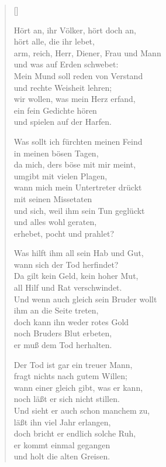 \begin{multicols}{2}
\settowidth{\versewidth}{Was hilft ihm all sein Hab und Gut,}
\begin{verse}[\versewidth]

 Hört an, ihr Völker, hört doch an,\\
hört alle, die ihr lebet,\\
arm, reich, Herr, Diener, Frau und Mann\\
und was auf Erden schwebet:\\
Mein Mund soll reden von Verstand\\
und rechte Weisheit lehren;\\
wir wollen, was mein Herz erfand,\\
ein fein Gedichte hören\\
und spielen auf der Harfen.

 Was sollt ich fürchten meinen Feind\\
in meinen bösen Tagen,\\
da mich, ders böse mit mir meint,\\
umgibt mit vielen Plagen,\\
wann mich mein Untertreter drückt\\
mit seinen Missetaten\\
und sich, weil ihm sein Tun geglückt\\
und alles wohl geraten,\\
erhebet, pocht und prahlet?

 Was hilft ihm all sein Hab und Gut,\\
wann sich der Tod herfindet?\\
Da gilt kein Geld, kein hoher Mut,\\
all Hilf und Rat verschwindet.\\
Und wenn auch gleich sein Bruder wollt\\
ihm an die Seite treten,\\
doch kann ihn weder rotes Gold\\
noch Bruders Blut erbeten,\\
er muß dem Tod herhalten.

 Der Tod ist gar ein treuer Mann,\\
fragt nichts nach gutem Willen;\\
wann einer gleich gibt, was er kann,\\
noch läßt er sich nicht stillen.\\
Und sieht er auch schon manchem zu,\\
läßt ihn viel Jahr erlangen,\\
doch bricht er endlich solche Ruh,\\
er kommt einmal gegangen\\
und holt die alten Greisen.


\end{verse}
\end{multicols}
